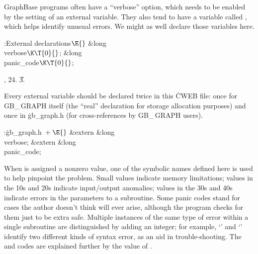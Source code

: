 GraphBase programs often have a ``verbose'' option, which needs to
be enabled by the setting of an external variable. They also tend to have
a variable called , which helps identify unusual errors.
We might as well declare those variables here.

\Y\B\4:External declarations\X${}\E{}$\6
\&{long} \\{verbose}${}\K\T{0}{}$;\6
\&{long} \\{panic\_code}${}\K\T{0}{}$;\par
{}, 24.
\U3.\fi

Every external variable should be declared twice in this \.{CWEB}
file: once for {\sc GB\_\,GRAPH} itself (the ``real'' declaration for
storage allocation purposes) and once in \.{gb\_graph.h} (for
cross-references by {\sc GB\_\,GRAPH} users).

\Y\B\4:\.{gb\_graph.h\,}\X${}\mathrel+\E{}$\6
\&{extern} \&{long} \\{verbose};\6
\&{extern} \&{long} \\{panic\_code};%
\par
\fi

When  is assigned a nonzero value, one of the symbolic
names defined here is used to help pinpoint the problem.
Small values indicate memory limitations; values in the 10s and 20s
indicate input/output anomalies; values in the 30s and 40s indicate
errors in the parameters to a subroutine. Some panic codes
stand for cases the author doesn't think will ever arise, although
the program checks for them just to be extra safe. Multiple instances
of the same type of error within a single subroutine are distinguished
by adding an integer; for example, `' and `'
identify two different kinds of syntax error, as an aid in trouble-shooting.
The  and  codes are
explained further
by the value of .

